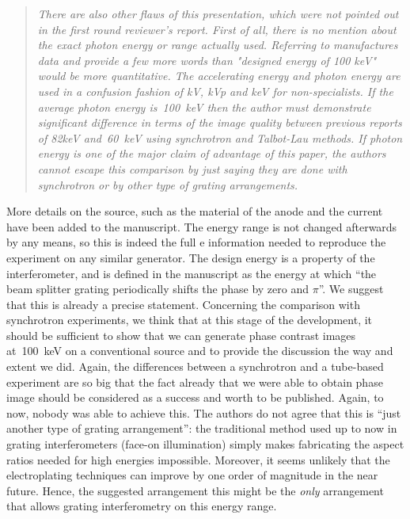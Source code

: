 \documentclass[a4paper,english]{scrartcl}
\newenvironment{reviewerquote}{\begin{quote}\itshape}{\end{quote}}
\begin{document}
\begin{reviewerquote}
There are also other flaws of this presentation, which were not
pointed out in the first round reviewer's report. First of all, there is no
mention about the exact photon energy or range actually used. Referring to
manufactures data and provide a few more words than "designed energy of 100
keV" would be more quantitative. The accelerating energy and photon energy
are used in a confusion fashion of kV, kVp and keV for non-specialists. If
the average photon energy is~\SI{100}{\kilo\eV} then the author must demonstrate
significant difference in terms of the image quality between previous
reports of 82keV and~\SI{60}{\kilo\eV} using synchrotron and Talbot-Lau methods. If
photon energy is one of the major claim of advantage of this paper, the
authors cannot escape this comparison by just saying they are done with
synchrotron or by other type of grating arrangements.
\end{reviewerquote}

More details on the source, such as the material of the anode and the
current have been added to the manuscript. The energy range is not changed
afterwards by any means, so this is indeed the full                                                   e
information needed to reproduce the experiment on any similar generator.
The design energy is a property of the interferometer, and is defined in the
manuscript as the energy at which ``the beam splitter grating periodically
shifts the phase by zero and $\pi$''. We suggest that this is already a
precise statement.
Concerning the comparison with synchrotron experiments, we think
that at this stage of the development, it should be sufficient to show that
we can generate phase contrast images at~\SI{100}{\kilo\eV} on a conventional source
and to provide the discussion the way and extent we did. Again, the differences
between a synchrotron and a tube-based experiment are so big that the fact
already that we were able to obtain phase image should be considered as a
success and worth to be
published. Again, to now, nobody was able to achieve this.
The authors do not agree that this is ``just another type of grating
arrangement'': the traditional method used up to now in grating
interferometers (face-on illumination) simply makes fabricating the aspect
ratios needed for high energies impossible. Moreover, it seems unlikely that
the electroplating techniques can improve by one order of magnitude in the
near future.
Hence, the suggested arrangement this might be the \emph{only} arrangement
that allows grating interferometry on this energy range.
\end{document}
